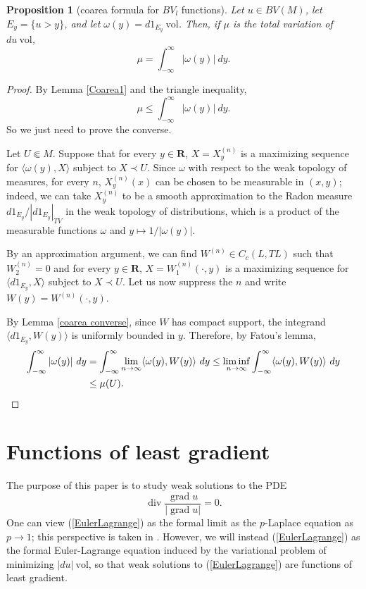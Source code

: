 \documentclass[reqno,12pt,letterpaper]{amsart}
\newcommand{\RR}{\mathbf{R}}
\DeclareMathOperator{\Div}{div}
\DeclareMathOperator{\grad}{grad}
\newcommand{\vol}{\mathrm{vol}}
\newtheorem{proposition}[theorem]{Proposition}
\theoremstyle{definition}
\numberwithin{equation}{section}
\begin{document}
\begin{proposition}[coarea formula for $BV_l$ functions]\label{Coarea2}
Let $u \in BV(M)$, let $E_y = \{u > y\}$, and let $\omega(y) = d1_{E_y} ~\vol$.
Then, if $\mu$ is the total variation of $du ~\vol$,
$$\mu = \int_{-\infty}^\infty |\omega(y)| ~dy.$$
\end{proposition}
\begin{proof}
By Lemma \ref{Coarea1} and the triangle inequality,
$$\mu \leq \int_{-\infty}^\infty |\omega(y)| ~dy.$$
So we just need to prove the converse.

Let $U \Subset M$.
Suppose that for every $y \in \RR$, $X = X^{(n)}_y$ is a maximizing sequence for $\langle \omega(y), X\rangle$ subject to $X \prec U$.
Since $\omega$ with respect to the weak topology of measures, for every $n$, $X^{(n)}_y(x)$ can be chosen to be measurable in $(x, y)$; indeed, we can take $X^{(n)}_y$ to be a smooth approximation to the Radon measure $d 1_{E_y}/|d 1_{E_y}|_{TV}$ in the weak topology of distributions, which is a product of the measurable functions $\omega$ and $y \mapsto 1/|\omega(y)|$.

By an approximation argument, we can find $W^{(n)} \in C_c(L, TL)$ such that $W^{(n)}_2 = 0$ and for every $y \in \RR$, $X = W^{(n)}_1(\cdot, y)$ is a maximizing sequence for $\langle d 1_{E_y}, X\rangle$ subject to $X \prec U$.
Let us now suppress the $n$ and write $W(y) = W^{(n)}(\cdot, y)$.

By Lemma \ref{coarea converse}, since $W$ has compact support, the integrand $\langle d 1_{E_y}, W(y)\rangle$ is uniformly bounded in $y$.
Therefore, by Fatou's lemma,
\begin{align*}
\int_{-\infty}^\infty |\omega(y)| ~dy &= \int_{-\infty}^\infty \lim_{n \to \infty} \langle \omega(y), W(y)\rangle ~dy \leq \liminf_{n \to \infty} \int_{-\infty}^\infty \langle \omega(y), W(y)\rangle ~dy \\
&\leq \mu(U). \qedhere
\end{align*}
\end{proof}


\section{Functions of least gradient}\label{LeastGradientFunctions}
The purpose of this paper is to study weak solutions to the PDE
\begin{equation}\label{EulerLagrange}
\Div \frac{\grad u}{|\grad u|} = 0.
\end{equation}
One can view (\ref{EulerLagrange}) as the formal limit as the $p$-Laplace equation as $p \to 1$; this perspective is taken in \cite[\S4]{daskalopoulos2020transverse}.
However, we will instead (\ref{EulerLagrange}) as the formal Euler-Lagrange equation induced by the variational problem of minimizing $|du|~\vol$, so that weak solutions to (\ref{EulerLagrange}) are functions of least gradient.
\end{document}
